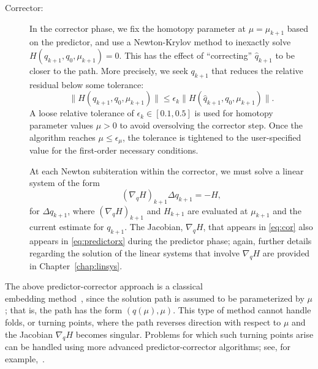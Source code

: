 \begin{description}
  \item[Corrector:] In the corrector phase, we fix the homotopy parameter
    at $\mu=\mu_{k+1}$ based on the predictor, and use a Newton-Krylov method to
    inexactly solve $H(q_{k+1},q_0,\mu_{k+1}) = 0$.  This has the effect of
    ``correcting'' $\hat{q}_{k+1}$ to be closer to the path.  More precisely,
    we seek $q_{k+1}$ that reduces the relative residual below some tolerance:
    \begin{equation}\label{eq:cornt}
      \lVert H(q_{k+1},q_0,\mu_{k+1}) \rVert \leq
      \epsilon_k \lVert H(\hat{q}_{k+1},q_0,\mu_{k+1}) \rVert.
    \end{equation}
    A loose relative tolerance of $\epsilon_k \in [0.1,0.5]$ is used for
    homotopy parameter values $\mu > 0$ to avoid oversolving the corrector step.
    Once the algorithm reaches $\mu \leq \epsilon_\mu$, the tolerance is tightened to the
    user-specified value for the first-order necessary conditions.
    
    At each Newton subiteration within the corrector, we must solve a linear
    system of the form
    \begin{equation}\label{eq:cor}
      \left(\nabla_q H \right)_{k+1} \Delta q_{k+1} = -H,
    \end{equation}
    for $\Delta q_{k+1}$, where $(\nabla_q H)_{k+1}$ and $H_{k+1}$ are evaluated
    at $\mu_{k+1}$ and the current estimate for $q_{k+1}$.  The Jacobian,
    $\nabla_q H$, that appears in \eqref{eq:cor} also appears in
    \eqref{eq:predictorx} during the predictor phase; again, further details
    regarding the solution of the linear systems that involve $\nabla_q H$ are
    provided in Chapter~\ref{chap:linsys}.

\end{description}

\begin{remark}
  The above predictor-corrector approach is a classical \\  embedding
  method~\cite{allgower_georg_1993}, since the solution path is assumed to be
  parameterized by $\mu$; that is, the path has the form $(q(\mu),\mu)$.  This
  type of method cannot handle folds, or turning points, where the path reverses
  direction with respect to $\mu$ and the Jacobian $\nabla_q H$ becomes
  singular.  Problems for which such turning points arise can be handled using
  more advanced predictor-corrector algorithms; see, for
  example,~\cite{walker:1999}.
\end{remark}

